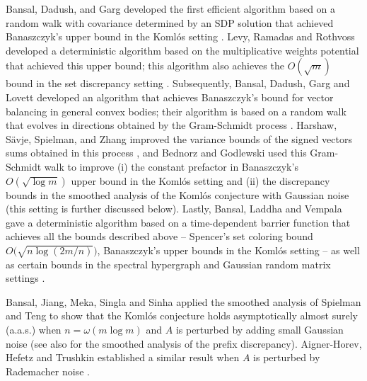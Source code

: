 \documentclass[reqno]{amsart}
\numberwithin{equation}{section}
\begin{document}
 Bansal, Dadush, and Garg  developed the first efficient algorithm based on a random walk with covariance  determined by an SDP solution that achieved Banaszczyk's upper bound in the Koml\'os    setting \cite{BDG19}. Levy, Ramadas and Rothvoss  developed a   deterministic algorithm based on the  multiplicative weights potential that achieved this upper bound; this algorithm also achieves the  $O(\sqrt {m})$ bound in the set discrepancy setting \cite{LRR17}. Subsequently, Bansal,   Dadush,  Garg and Lovett   developed an algorithm that achieves Banaszczyk's bound for vector balancing in general convex bodies; their algorithm is based on a random walk that evolves in  directions obtained by the Gram-Schmidt process \cite{BDGL19}. Harshaw, S\"avje,  Spielman, and Zhang improved the variance bounds of the signed vectors sums  obtained in this process \cite{HSS24}, and Bednorz and Godlewski  used this Gram-Schmidt walk  to improve (i) the constant prefactor in Banaszczyk's $O(\sqrt {\log m})$ upper bound in the Koml\'os setting and (ii) the discrepancy bounds in the smoothed analysis of the Koml\'os  conjecture with Gaussian noise (this setting is further discussed below)\cite{BG26}.     Lastly, Bansal, Laddha and Vempala gave a deterministic algorithm based on 
a time-dependent barrier function that achieves all the bounds described above -- Spencer's  set coloring bound $O \big(\sqrt {n \log( 2m /n) }\big) $, Banaszczyk's upper bounds in the Koml\'os   setting -- as well as certain bounds in the spectral hypergraph and Gaussian random matrix settings \cite{BLV22}.  

Bansal,  Jiang,  Meka,  Singla and Sinha  applied the smoothed analysis of Spielman and Teng \cite{ST04} to show that the Koml\'os conjecture holds asymptotically almost surely (a.a.s.) when $n= \omega(m \log m)$ and $A$ is perturbed by adding small Gaussian noise \cite {BJMSS22} (see also \cite{BHMSS22} for the smoothed analysis of the prefix discrepancy). Aigner-Horev, Hefetz and Trushkin established a similar result  when $A$ is perturbed by Rademacher noise \cite {AHT25}. 


  
\end{document}
